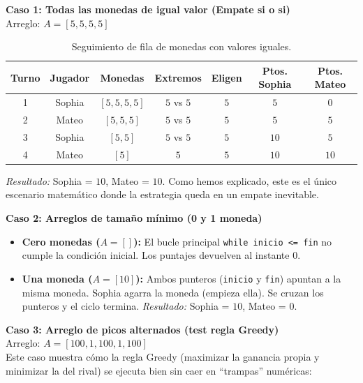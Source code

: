 \textbf{Caso 1: Todas las monedas de igual valor (Empate si o si)} 
\\
Arreglo: $A = [5, 5, 5, 5]$

\begin{table}[H]
    \centering
    \renewcommand{\arraystretch}{1.2}
    \begin{tabular}{|c|c|c|c|c|c|c|}
    \hline
    \textbf{Turno} & \textbf{Jugador} & \textbf{Monedas} & \textbf{Extremos} & \textbf{Eligen} & \textbf{Ptos. Sophia} & \textbf{Ptos. Mateo} \\ \hline
    1 & Sophia & $[5, 5, 5, 5]$ & $5$ vs $5$ & $5$ & $5$ & $0$ \\ \hline
    2 & Mateo & $[5, 5, 5]$ & $5$ vs $5$ & $5$ & $5$ & $5$ \\ \hline
    3 & Sophia & $[5, 5]$ & $5$ vs $5$ & $5$ & $10$ & $5$ \\ \hline
    4 & Mateo & $[5]$ & $5$ & $5$ & $10$ & $10$ \\ \hline
    \end{tabular}
    \caption{Seguimiento de fila de monedas con valores iguales.}
    \label{tab:caso1}
\end{table}

\textit{Resultado:} Sophia = $10$, Mateo = $10$. Como hemos explicado, este es el único escenario matemático donde la estrategia queda en un empate inevitable.

\textbf{Caso 2: Arreglos de tamaño mínimo (0 y 1 moneda)} 
\\
\begin{itemize}
    \item \textbf{Cero monedas ($A = []$):} El bucle principal \verb|while inicio <= fin| no cumple la condición inicial. Los puntajes devuelven al instante $0$.
    \item \textbf{Una moneda ($A = [10]$):} Ambos punteros (\verb|inicio| y \verb|fin|) apuntan a la misma moneda. Sophia agarra la moneda (empieza ella). Se cruzan los punteros y el ciclo termina. \textit{Resultado:} Sophia = $10$, Mateo = $0$.
\end{itemize}

\textbf{Caso 3: Arreglo de picos alternados (test regla Greedy)} 
\\
Arreglo: $A = [100, 1, 100, 1, 100]$ 
\\
Este caso muestra cómo la regla Greedy (maximizar la ganancia propia y minimizar la del rival) se ejecuta bien sin caer en ``trampas'' numéricas:

